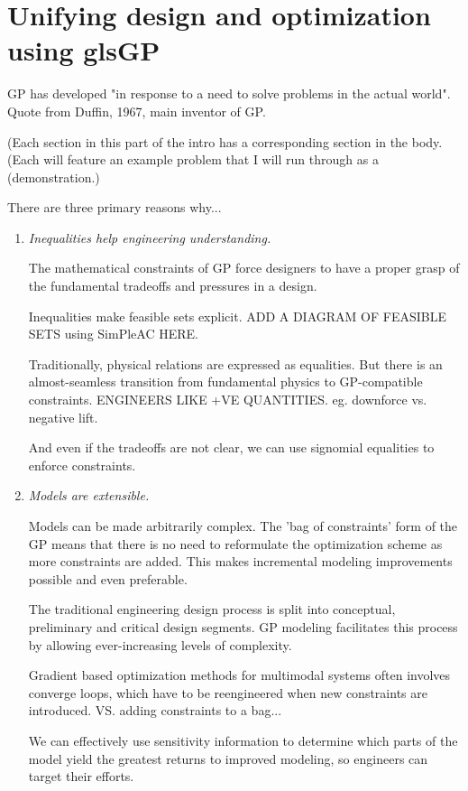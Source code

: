 \section{Unifying design and optimization using gls{GP}}


\gls{GP} has developed "in response to a need to solve problems in the actual 
world".~\cite{duffingp} Quote from Duffin, 1967, main inventor of GP.

(Each section in this part of the intro has a corresponding section in the body.
(Each will feature an example problem that I will run through as a
(demonstration.)

There are three primary reasons why...

\begin{enumerate}     \item \textit{Inequalities help engineering
understanding.}

The mathematical constraints of \gls{GP} force designers to have a proper grasp
of the fundamental tradeoffs and pressures in a design.

Inequalities make feasible sets explicit. ADD A DIAGRAM OF FEASIBLE SETS using
SimPleAC HERE.

Traditionally, physical relations are expressed as equalities. But there is an
almost-seamless transition from fundamental physics to GP-compatible
constraints. ENGINEERS LIKE +VE QUANTITIES. eg. downforce vs. negative lift.

And even if the tradeoffs are not clear, we can use signomial equalities to
enforce constraints.

    \item \textit{Models are extensible.}
    
Models can be made arbitrarily complex. The 'bag of constraints' form of the GP
means that there is no need to reformulate the optimization scheme as more
constraints are added. This makes incremental modeling improvements possible and
even preferable.

The traditional engineering design process is split into conceptual, preliminary
and critical design segments. GP modeling facilitates this process by allowing
ever-increasing levels of complexity.

Gradient based optimization methods for multimodal systems often involves
converge loops, which have to be reengineered when new constraints are
introduced. VS. adding constraints to a bag...

We can effectively use sensitivity information to determine which parts of the
model yield the greatest returns to improved modeling, so engineers can target
their efforts.


\end{enumerate}
